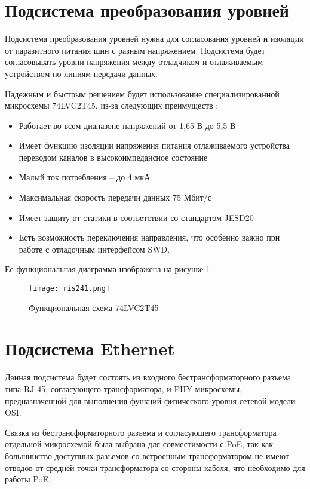 \section{Подсистема преобразования уровней}
\hspace{1cm}

Подсистема преобразования уровней нужна для согласования уровней и изоляции от паразитного 
питания шин с разным напряжением. Подсистема будет согласовывать уровни напряжения между
отладчиком и отлаживаемым устройством по линиям передачи данных. 

Надежным и быстрым решением будет использование специализированной микросхемы 74LVC2T45, из-за
следующих преимуществ \cite{SN74LVC2T45:datasheet}:
\begin{itemize}
  \item Работает во всем диапазоне напряжений от 1,65 В до 5,5 В
  \item Имеет функцию изоляции напряжения питания отлаживаемого устройства переводом каналов в
  высокоимпедансное состояние
  \item Малый ток потребления -- до 4 мкА
  \item Максимальная скорость передачи данных 75 Мбит/с
  \item Имеет защиту от статики в соответствии со стандартом JESD20
  \item Есть возможность переключения направления, что особенно важно при работе с отладочным 
  интерфейсом SWD.
\end{itemize}
 Ее функциональная диаграмма изображена на рисунке \ref{ris:241}.

\begin{figure}[H]
  \centering
  \texttt{[image: ris241.png]}
  \caption{Функциональная схема 74LVC2T45}
  \label{ris:241}
\end{figure}


\section{Подсистема Ethernet}
\hspace{1cm}

Данная подсистема будет состоять из входного бестрансформаторного разъема типа RJ-45, 
согласующего трансформатора, и PHY-микросхемы, предназначенной для выполнения функций 
физического уровня сетевой модели OSI.

Связка из бестрансформаторного разъема и согласующего трансформатора отдельной
микросхемой была выбрана для совместимости с PoE, так как большинство доступных разъемов со 
встроенным трансформатором не имеют отводов от средней точки трансформатора со стороны кабеля,
что необходимо для работы PoE. 

